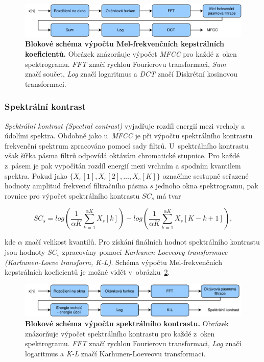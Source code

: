 \begin{figure}[h]
    \centering
    \includegraphics[width=\textwidth]{obrazky/MFCC.pdf}
    \caption{\textbf{Blokové schéma výpočtu Mel-frekvenčních kepstrálních koeficientů.} Obrázek znázorňuje výpočet \textit{MFCC} pro každé z~oken spektrogramu. \textit{FFT} značí rychlou Fourierovu transformaci, \textit{Sum} značí součet, \textit{Log} značí logaritmus a \textit{DCT} značí Diskrétní kosinovou transformaci.}
    \label{obr_MFCC}
\end{figure}

\subsubsection*{Spektrální kontrast}
\textit{Spektrální kontrast (Spectral contrast)} vyjadřuje rozdíl energií mezi vrcholy a údolími spektra. Obdobně jako u~\textit{MFCC} je při výpočtu spektrálního kontrastu frekvenční spektrum zpracováno pomocí sady filtrů. U~spektrálního kontrastu však šířka pásma filtrů odpovídá oktávám chromatické stupnice. Pro každé z~pásem je pak vypočítán rozdíl energií mezi vrchním a spodním kvantilem spektra. Pokud jako $\{X_s[1], X_s[2], \dots , X_s[K]\}$ označíme sestupně seřazené hodnoty amplitud frekvencí filtračního pásma $s$ jednoho okna spektrogramu, pak rovnice pro výpočet spektrálního kontrastu $SC_s$ má tvar

\begin{equation}
	SC_s = log(\frac{1}{\alpha K} \sum\limits_{k=1}^{\alpha K} X_s[k]) - log(\frac{1}{\alpha K} \sum\limits_{k=1}^{\alpha K} X_s[K-k+1]),
\end{equation}

\medskip

\noindent kde $\alpha$ značí velikost kvantilů. Pro získání finálních hodnot spektrálního kontrastu jsou hodnoty $SC_s$ zpracovány pomocí \textit{Karhunen-Loeveovy transformace (Karhunen-Loeve transform, K-L)}. Schéma výpočtu Mel-frekvenčních kepstrálních koeficientů je možné vidět v~obrázku~\ref{obr_SC}.\cite{1035731}\cite{mircom}

\begin{figure}[h]
    \centering
    \includegraphics[width=\textwidth]{obrazky/SC.pdf}
    \caption{\textbf{Blokové schéma výpočtu spektrálního kontrastu.} Obrázek znázorňuje výpočet spektrálního kontrastu pro každé z~oken spektrogramu. \textit{FFT} značí rychlou Fourierovu transformaci, \textit{Log} značí logaritmus a \textit{K-L} značí Karhunen-Loeveovu transformaci.}
    \label{obr_SC}
\end{figure}

